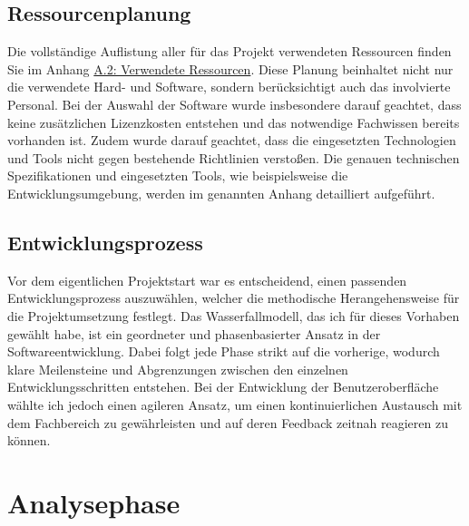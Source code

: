 \documentclass[a4paper,12pt]{article}
\begin{document}
\subsection{Ressourcenplanung}
\label{sec:ressourcenplanung}
Die vollständige Auflistung aller für das Projekt verwendeten Ressourcen finden Sie im Anhang \hyperref[sec:ressourcen]{A.2: Verwendete Ressourcen}. Diese Planung beinhaltet nicht nur die verwendete Hard- und Software, sondern berücksichtigt auch das involvierte Personal. Bei der Auswahl der Software wurde insbesondere darauf geachtet, dass keine zusätzlichen Lizenzkosten entstehen und das notwendige Fachwissen bereits vorhanden ist. Zudem wurde darauf geachtet, dass die eingesetzten Technologien und Tools nicht gegen bestehende Richtlinien verstoßen. Die genauen technischen Spezifikationen und eingesetzten Tools, wie beispielsweise die Entwicklungsumgebung, werden im genannten Anhang detailliert aufgeführt.

\subsection{Entwicklungsprozess}
\label{sec:entwicklungsprozess}
Vor dem eigentlichen Projektstart war es entscheidend, einen passenden Entwicklungsprozess auszuwählen, welcher die methodische Herangehensweise für die Projektumsetzung festlegt. Das Wasserfallmodell, das ich für dieses Vorhaben gewählt habe, ist ein geordneter und phasenbasierter Ansatz in der Softwareentwicklung. Dabei folgt jede Phase strikt auf die vorherige, wodurch klare Meilensteine und Abgrenzungen zwischen den einzelnen Entwicklungsschritten entstehen\cite{pressman2014software}. Bei der Entwicklung der Benutzeroberfläche wählte ich jedoch einen agileren Ansatz, um einen kontinuierlichen Austausch mit dem Fachbereich zu gewährleisten und auf deren Feedback zeitnah reagieren zu können.

\section{Analysephase}
\end{document}

